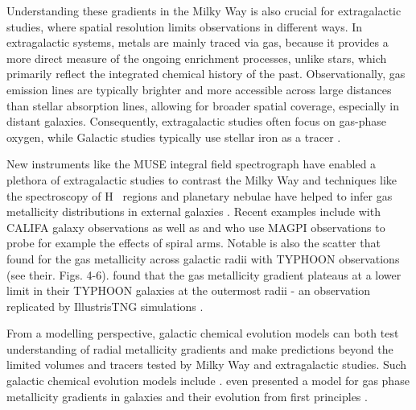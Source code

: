 \documentclass[twocolumn,apj,numberedappendix,appendixfloats,twocolappendix]{openjournal}
\begin{document}
\begin{CJK*}{UTF8}{gbsn}
Understanding these gradients in the Milky Way is also crucial for extragalactic studies, where spatial resolution limits observations in different ways. In extragalactic systems, metals are mainly traced via gas, because it provides a more direct measure of the ongoing enrichment processes, unlike stars, which primarily reflect the integrated chemical history of the past. Observationally, gas emission lines are typically brighter and more accessible across large distances than stellar absorption lines, allowing for broader spatial coverage, especially in distant galaxies. Consequently, extragalactic studies often focus on gas-phase oxygen, while Galactic studies typically use stellar iron as a tracer \citep[e.g.][]{Nicholls2017, FraserMcKelvie2022}.

New instruments like the MUSE integral field spectrograph have enabled a plethora of extragalactic studies to contrast the Milky Way and techniques like the spectroscopy of H~{} regions and planetary nebulae have helped to infer gas metallicity distributions in external galaxies \citep{Shaver1983, Vilchez1996, Rolleston2000, Bresolin2012}. Recent examples include \citet{Sanchez2014} with CALIFA galaxy observations as well as \citet{Mun2024} and \citet{Chen2024} who use MAGPI observations to probe for example the effects of spiral arms. Notable is also the scatter that \citet{Chen2023} found for the gas metallicity across galactic radii with TYPHOON observations (see their. Figs. 4-6). \citet{Grasha2022} found that the gas metallicity gradient plateaus at a lower limit in their TYPHOON galaxies at the outermost radii - an observation replicated by IllustrisTNG simulations \citep{Hemler2021, Garcia2023}.

From a modelling perspective, galactic chemical evolution models can both test understanding of radial metallicity gradients and make predictions beyond the limited volumes and tracers tested by Milky Way and extragalactic studies. Such galactic chemical evolution models include \citet{Chiappini2001, Matteucci2001, Minchev2014b, Kubryk2015, Stanghellini2015, Rybizki2017, Johnson2024}. \citet{Sharda2021} even presented a model for gas phase metallicity gradients in galaxies and their evolution from first principles \citep[see also][]{Krumholz2018b}. 


\end{CJK*}
\end{document}
